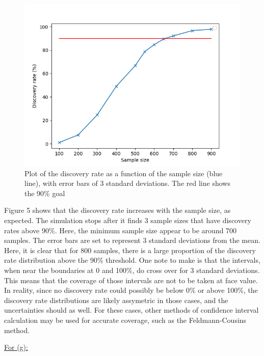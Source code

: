 \documentclass[12pt]{report} %
\begin{document}
\begin{figure}[htb]
    \centering
    \includegraphics[width=\textwidth]{../plots/plot_f.png}
    \captionsetup{margin=1.3cm}
    \caption[width=0.2\pdfpagewidth]{Plot of the discovery rate as a function of the sample size (blue line), with error bars of 3 standard deviations. The red line shows the 90\% goal}
\end{figure}
\vspace{1\baselineskip}
Figure 5 shows that the discovery rate increases with the sample size, as expected. The simulation stops after it finds 3 sample sizes that have discovery rates above 90\%. Here, the minimum sample size appear to be around 700 samples. The error bars are set to represent 3 standard deviations from the mean. Here, it is clear that for 800 samples, there is a large proportion of the discovery rate distribution above the 90\% threshold. One note to make is that the intervals, when near the boundaries at 0 and 100\%, do cross over for 3 standard deviations. This means that the coverage of those intervals are not to be taken at face value. In reality, since no discovery rate could possibly be below 0\% or above 100\%, the discovery rate distributions are likely assymetric in those cases, and the uncertainties should as well. For these cases, other methods of confidence interval calculation may be used for accurate coverage, such as the Feldmann-Cousins method\cite{PhysRevD.57.3873}. 

\vspace*{1\baselineskip}

\underline{For (g):}
\end{document}
